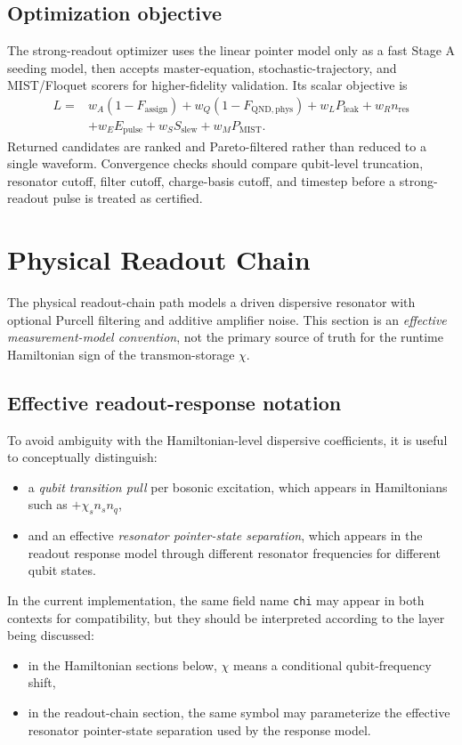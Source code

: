 \documentclass[11pt]{article}
\begin{document}
\subsection*{Optimization objective}
The strong-readout optimizer uses the linear pointer model only as a fast Stage
A seeding model, then accepts master-equation, stochastic-trajectory, and
MIST/Floquet scorers for higher-fidelity validation. Its scalar objective is
\[
\begin{aligned}
L ={}& w_A(1-F_{\mathrm{assign}})
    + w_Q(1-F_{\mathrm{QND,phys}})
    + w_L P_{\mathrm{leak}}
    + w_R n_{\mathrm{res}} \\
   &+ w_E E_{\mathrm{pulse}}
    + w_S S_{\mathrm{slew}}
    + w_M P_{\mathrm{MIST}}.
\end{aligned}
\]
Returned candidates are ranked and Pareto-filtered rather than reduced to a
single waveform. Convergence checks should compare qubit-level truncation,
resonator cutoff, filter cutoff, charge-basis cutoff, and timestep before a
strong-readout pulse is treated as certified.

\section{Physical Readout Chain}
The physical readout-chain path models a driven dispersive resonator with optional
Purcell filtering and additive amplifier noise. This section is an \emph{effective
measurement-model convention}, not the primary source of truth for the runtime
Hamiltonian sign of the transmon-storage \(\chi\).

\subsection*{Effective readout-response notation}
To avoid ambiguity with the Hamiltonian-level dispersive coefficients, it is useful
to conceptually distinguish:
\begin{itemize}[leftmargin=1.5em]
  \item a \emph{qubit transition pull} per bosonic excitation, which appears in
  Hamiltonians such as \(+\chi_s n_s n_q\),
  \item and an effective \emph{resonator pointer-state separation}, which appears
  in the readout response model through different resonator frequencies for different
  qubit states.
\end{itemize}

\noindent
In the current implementation, the same field name \texttt{chi} may appear in both
contexts for compatibility, but they should be interpreted according to the layer
being discussed:
\begin{itemize}[leftmargin=1.5em]
  \item in the Hamiltonian sections below, \(\chi\) means a conditional qubit-frequency shift,
  \item in the readout-chain section, the same symbol may parameterize the effective
  resonator pointer-state separation used by the response model.
\end{itemize}
\end{document}
